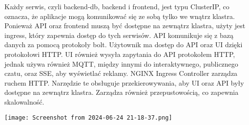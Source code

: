 \documentclass[12pt,a4paper]{article}
\begin{document}
Każdy serwis, czyli backend-db, backend i frontend, jest typu ClusterIP, co oznacza, że aplikacje mogą komunikować się ze sobą tylko we wnątrz klastra. Ponieważ API oraz frontend muszą być dostępne na zewnątrz klastra, użyty jest ingress, który zapewnia dostęp do tych serwisów.
API komunikuje się z bazą danych za pomocą protokoły bolt. Użytownik ma dostęp do API oraz UI dzięki protokołowi HTTP. UI również wysyła zapytania do API protokołem HTTP, jednak używa również MQTT, między innymi do interaktywnego, publicznego czatu, oraz SSE, aby wyświetlać reklamy.
NGINX Ingress Controller zarządza ruchem HTTP. Narzędzie te obsługuje przekierowywania, aby UI oraz API były dostępne na zewnątrz klastra. Zarządza również przepustowością, co zapewnia skalowalność.

\texttt{[image: Screenshot from 2024-06-24 21-18-37.png]}
\end{document}

